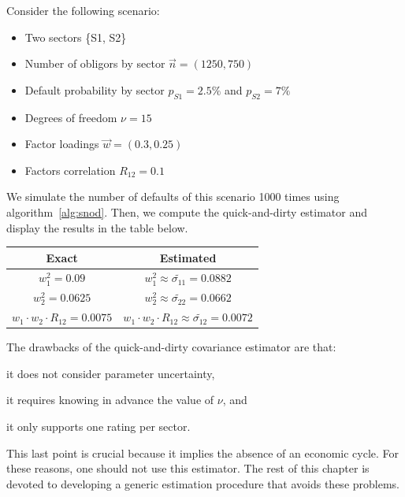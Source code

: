 \documentclass[11pt,fleqn]{book} %
\begin{document}
\begin{example}
	Consider the following scenario:
	\begin{itemize}
		\item Two sectors \{S1, S2\}
		\item Number of obligors by sector $\vec{n} = (1250, 750)$
		\item Default probability by sector $p_{S1} = 2.5\%$ and $p_{S2} = 7\%$
		\item Degrees of freedom $\nu = 15$
		\item Factor loadings $\vec{w} = (0.3, 0.25)$
		\item Factors correlation $R_{12} = 0.1$
	\end{itemize}
	We simulate the number of defaults of this scenario \num{1000} times using 
	algorithm~\ref{alg:snod}. Then, we compute the quick-and-dirty estimator 
	and display the results in the table below.

	\hspace*{1cm}
	\begin{tabular}{|c|c|}
		\hline
		Exact & Estimated \\
		\hline
		$w_1^2 = 0.09$ & $w_1^2 \approx \widetilde{\sigma_{11}} = 0.0882$ \\
		\hline
		$w_2^2 = 0.0625$ & $w_2^2 \approx \widetilde{\sigma_{22}} = 0.0662$ \\
		\hline
		$w_1 \cdot w_2 \cdot R_{12} = 0.0075$ & $w_1 \cdot w_2 \cdot R_{12} \approx \widetilde{\sigma_{12}} = 0.0072$ \\
		\hline
	\end{tabular}
\end{example}

The drawbacks of the quick-and-dirty covariance estimator are that:
\begin{inparaenum}[1)]
	\item it does not consider parameter uncertainty, 
	\item it requires knowing in advance the value of $\nu$, and
	\item it only supports one rating per sector.
\end{inparaenum}
This last point is crucial because it implies the absence of an economic 
cycle. For these reasons, one should not use this estimator. The rest of 
this chapter is devoted to developing a generic estimation procedure that 
avoids these problems.

\end{document}
